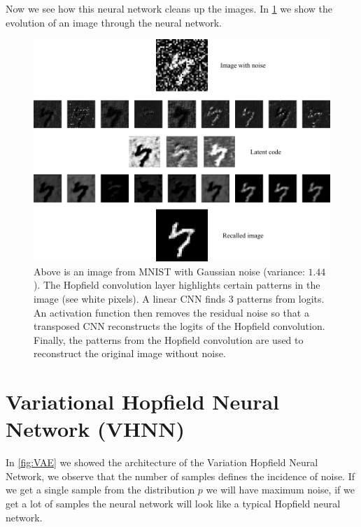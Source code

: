 \noindent Now we see how this neural network cleans up the images. In \cref{fig:CNNexample} we show the evolution of an image through the neural network.
\begin{figure}[htbp]
    \centering
    \includegraphics[width=1.0\linewidth]{Figures/CNNexample.png}
    \caption{Above is an image from MNIST with Gaussian noise (variance: $1.44$). The Hopfield convolution layer highlights certain patterns in the image (see white pixels). A linear CNN finds $3$ patterns from logits. An activation function then removes the residual noise so that a transposed CNN reconstructs the logits of the Hopfield convolution. Finally, the patterns from the Hopfield convolution are used to reconstruct the original image without noise.}
    \label{fig:CNNexample}
\end{figure}

\section{Variational Hopfield Neural Network (VHNN)}
In \cref{fig:VAE} we showed the architecture of the Variation Hopfield Neural Network, we observe that the number of samples defines the incidence of noise. If we get a single sample from the distribution $p$ we will have maximum noise, if we get a lot of samples the neural network will look like a typical Hopfield neural network.

